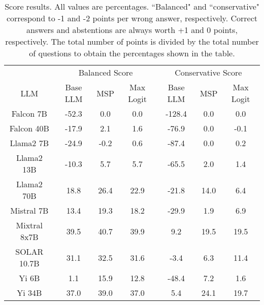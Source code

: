 \begin{table*}
\centering
\begin{tabular}{c|c|c|c|c|c|c}
& \multicolumn{3}{c|}{Balanced Score} & \multicolumn{3}{c}{Conservative Score} \\ 
LLM & Base LLM & MSP & Max Logit & Base LLM & MSP & Max Logit\\ \hline
Falcon 7B & -52.3 & 0.0 & 0.0 & -128.4 & 0.0 & 0.0\\
Falcon 40B & -17.9 & 2.1 & 1.6 & -76.9 & 0.0 & -0.1\\
Llama2 7B & -24.9 & -0.2 & 0.6 & -87.4 & 0.0 & 0.2\\
Llama2 13B & -10.3 & 5.7 & 5.7 & -65.5 & 2.0 & 1.4\\
Llama2 70B & 18.8 & 26.4 & 22.9 & -21.8 & 14.0 & 6.4\\
Mistral 7B & 13.4 & 19.3 & 18.2 & -29.9 & 1.9 & 6.9\\
Mixtral 8x7B & 39.5 & 40.7 & 39.9 & 9.2 & 19.5 & 19.5\\
SOLAR 10.7B & 31.1 & 32.5 & 31.6 & -3.4 & 6.3 & 11.4\\
Yi 6B & 1.1 & 15.9 & 12.8 & -48.4 & 7.2 & 1.6\\
Yi 34B & 37.0 & 39.0 & 37.0 & 5.4 & 24.1 & 19.7\\
\hline
\end{tabular}
\caption{Score results. All values are percentages. ``Balanced" and ``conservative" correspond to -1 and -2 points per wrong answer, respectively. Correct answers and abstentions are always worth +1 and 0 points, respectively. The total number of points is divided by the total number of questions to obtain the percentages shown in the table.}
\label{tab:score}
\end{table*}
